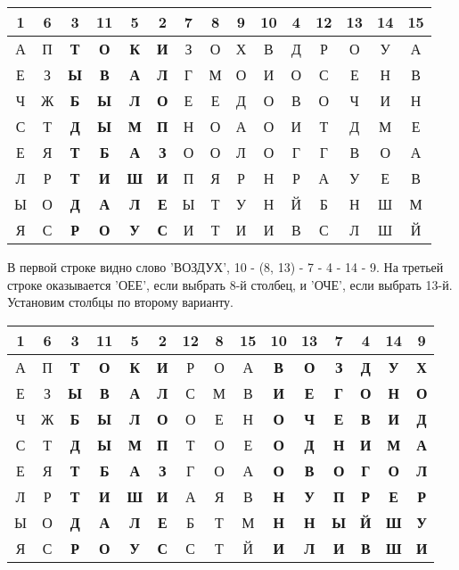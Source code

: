 \documentclass[letterpaper,11pt,openany]{book}
\begin{document}
{\centering
\begin{tabular}{||c|c|c|c|c|c|c|c|c|c|c|c|c|c|c||}
\hline
1 & 6 & 3 & 11 & 5 & 2 & 7 & 8 & 9 & 10 & 4 & 12 & 13 & 14 & 15 \\
\hline
А & П & \bf Т & \bf О & \bf К & \bf И & З & О & Х & В & Д & Р & О & У & А \\
\hline
Е & З & \bf Ы & \bf В & \bf А & \bf Л & Г & М & О & И & О & С & Е & Н & В \\
\hline
Ч & Ж & \bf Б & \bf Ы & \bf Л & \bf О & Е & Е & Д & О & В & О & Ч & И & Н \\
\hline
С & Т & \bf Д & \bf Ы & \bf М & \bf П & Н & О & А & О & И & Т & Д & М & Е \\
\hline
Е & Я & \bf Т & \bf Б & \bf А & \bf З & О & О & Л & О & Г & Г & В & О & А \\
\hline
Л & Р & \bf Т & \bf И & \bf Ш & \bf И & П & Я & Р & Н & Р & А & У & Е & В \\
\hline
Ы & О & \bf Д & \bf А & \bf Л & \bf Е & Ы & Т & У & Н & Й & Б & Н & Ш & М \\
\hline
Я & С & \bf Р & \bf О & \bf У & \bf С & И & Т & И & И & В & С & Л & Ш & Й \\
\hline
\end{tabular}
}

\medskip

В первой строке видно слово 'ВОЗДУХ', 10 - (8, 13) - 7 - 4 - 14 - 9. На третьей строке оказывается 'ОЕЕ', если выбрать 8-й столбец, и 'ОЧЕ', если выбрать 13-й. Установим столбцы по второму варианту.

\medskip

{\centering
\begin{tabular}{||c|c|c|c|c|c|c|c|c|c|c|c|c|c|c||}
\hline
1 & 6 & 3 & 11 & 5 & 2 & 12 & 8 & 15 & 10 & 13 & 7 & 4 & 14 & 9 \\
\hline
А & П & \bf Т & \bf О & \bf К & \bf И & Р & О & А & \bf В & \bf О & \bf З & \bf Д & \bf У & \bf Х \\
\hline
Е & З & \bf Ы & \bf В & \bf А & \bf Л & С & М & В & \bf И & \bf Е & \bf Г & \bf О & \bf Н & \bf О \\
\hline
Ч & Ж & \bf Б & \bf Ы & \bf Л & \bf О & О & Е & Н & \bf О & \bf Ч & \bf Е & \bf В & \bf И & \bf Д \\
\hline
С & Т & \bf Д & \bf Ы & \bf М & \bf П & Т & О & Е & \bf О & \bf Д & \bf Н & \bf И & \bf М & \bf А \\
\hline
Е & Я & \bf Т & \bf Б & \bf А & \bf З & Г & О & А & \bf О & \bf В & \bf О & \bf Г & \bf О & \bf Л \\
\hline
Л & Р & \bf Т & \bf И & \bf Ш & \bf И & А & Я & В & \bf Н & \bf У & \bf П & \bf Р & \bf Е & \bf Р \\
\hline
Ы & О & \bf Д & \bf А & \bf Л & \bf Е & Б & Т & М & \bf Н & \bf Н & \bf Ы & \bf Й & \bf Ш & \bf У \\
\hline
Я & С & \bf Р & \bf О & \bf У & \bf С & С & Т & Й & \bf И & \bf Л & \bf И & \bf В & \bf Ш & \bf И \\
\hline
\end{tabular}
}
\medskip
\end{document}
